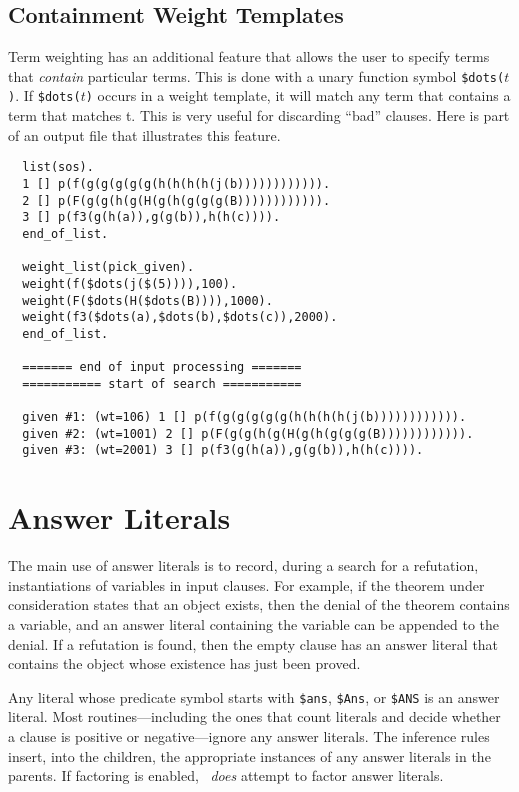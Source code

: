 \documentclass[11pt]{article}
\begin{document}
\subsection{Containment Weight Templates}

Term weighting has an additional feature that allows
the user to specify terms that \emph{contain} particular terms.
This is done with a unary function symbol \verb:$dots(:$t$\verb:):.
If \verb:$dots(:$t$\verb:): occurs in a weight template,
it will match any term that contains a term that
matches t.  This is very useful for discarding ``bad'' clauses.
Here is part of an output file that illustrates this feature.

{\small
\begin{verbatim}
  list(sos).
  1 [] p(f(g(g(g(g(g(h(h(h(h(j(b)))))))))))).
  2 [] p(F(g(g(h(g(H(g(h(g(g(g(B)))))))))))).
  3 [] p(f3(g(h(a)),g(g(b)),h(h(c)))).
  end_of_list.
  
  weight_list(pick_given).
  weight(f($dots(j($(5)))),100).
  weight(F($dots(H($dots(B)))),1000).
  weight(f3($dots(a),$dots(b),$dots(c)),2000).
  end_of_list.
  
  ======= end of input processing =======
  =========== start of search ===========
  
  given #1: (wt=106) 1 [] p(f(g(g(g(g(g(h(h(h(h(j(b)))))))))))).
  given #2: (wt=1001) 2 [] p(F(g(g(h(g(H(g(h(g(g(g(B)))))))))))).
  given #3: (wt=2001) 3 [] p(f3(g(h(a)),g(g(b)),h(h(c)))).
\end{verbatim}
}

\section{Answer Literals} \label{answer}

The main use of answer literals is to record, during a search for a
refutation, instantiations of variables in input clauses.  For
example, if the theorem under consideration states that an object
exists, then the denial of the theorem contains a variable, and an
answer literal containing the variable can be appended to the denial.
If a refutation is found, then the empty clause has an answer literal
that contains the object whose existence has just been proved.

Any literal whose predicate symbol starts with \verb:$ans:,
\verb:$Ans:, or \verb:$ANS: is an answer literal.  Most
routines---including the ones that count literals and decide whether a
clause is positive or negative---ignore any answer literals.  The
inference rules insert, into the children, the appropriate instances
of any answer literals in the parents.  If factoring is enabled,
\otter\ {\it does} attempt to factor answer literals.
\end{document}

